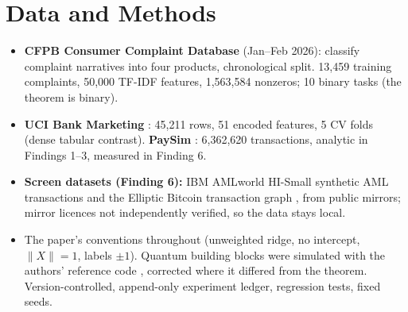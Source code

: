 \documentclass[10pt]{article}
\newenvironment{sectionblock}
{%
    \par
    \vspace{2pt}
    \noindent
    \begin{minipage}{\textwidth}
}
{%
    \end{minipage}
    \par
    \vspace{5pt}
}
\begin{document}
\begin{sectionblock}

\section{Data and Methods}
\label{sec:methods}

\begin{itemize}
    \item \textbf{CFPB Consumer Complaint Database} \cite{cfpb} (Jan--Feb 2026): classify complaint narratives into four products, chronological split. 13{,}459 training complaints, 50{,}000 TF-IDF features, 1{,}563{,}584 nonzeros; 10 binary tasks (the theorem is binary).
    \item \textbf{UCI Bank Marketing} \cite{moro2014}: 45{,}211 rows, 51 encoded features, 5 CV folds (dense tabular contrast). \textbf{PaySim} \cite{paysim}: 6{,}362{,}620 transactions, analytic in Findings 1--3, measured in Finding 6.
    \item \textbf{Screen datasets (Finding 6):} IBM AMLworld HI-Small synthetic AML transactions \cite{altman2023} and the Elliptic Bitcoin transaction graph \cite{weber2019}, from public mirrors; mirror licences not independently verified, so the data stays local.
    \item The paper's conventions throughout (unweighted ridge, no intercept, $\|X\|=1$, labels $\pm1$). Quantum building blocks were simulated with the authors' reference code \cite{qosref}, corrected where it differed from the theorem. Version-controlled, append-only experiment ledger, regression tests, fixed seeds.
\end{itemize}

\end{sectionblock}
\end{document}

